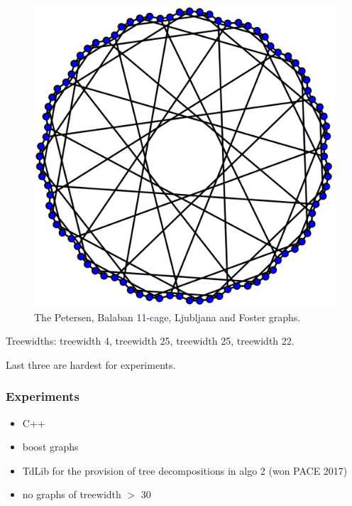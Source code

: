 \documentclass[11pt]{beamer}
\begin{document}
\begin{frame}
\begin{center}
\begin{figure}[h!]
\includegraphics[scale=0.06]{Foster}
\caption{The Petersen, Balaban 11-cage, Ljubljana and Foster graphs.}
\end{figure}
\end{center}

Treewidths: treewidth 4, treewidth 25, treewidth 25, treewidth 22.

Last three are hardest for experiments.

\end{frame}


\begin{frame}
\frametitle{Experiments}

\begin{itemize}
\item C++
\item boost graphs
\item TdLib for the provision of tree decompositions in algo 2 (won PACE 2017)
\item no graphs of treewidth $>$ 30
\end{itemize}
\end{frame}
\end{document}

